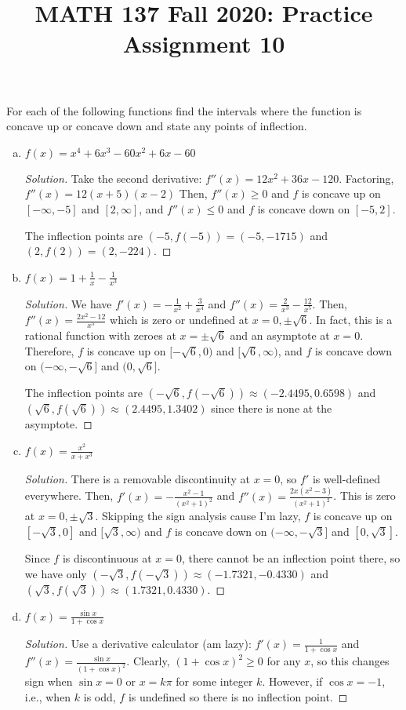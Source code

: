 
\title{MATH 137 Fall 2020: Practice Assignment 10}


\thispagestyle{firstpage}
\textbf{\@title}

\question For each of the following functions find the intervals where the function
is concave up or concave down and state any points of inflection.
\begin{enumerate}[(a)]
  \item $f(x) = x^4+6x^3-60x^2+6x-60$
        \begin{proof}[Solution]
          Take the second derivative: $f''(x) = 12x^2 + 36x - 120$.
          Factoring, $f''(x) = 12(x+5)(x-2)$
          Then, $f''(x) \geq 0$ and $f$ is concave up on $[-\infty,-5]$ and $[2,\infty]$,
          and $f''(x) \leq 0$ and $f$ is concave down on $[-5,2]$.

          The inflection points are $(-5,f(-5)) = (-5,-1715)$ and $(2,f(2)) = (2,-224)$.
        \end{proof}
  \item $f(x) = 1+\frac{1}{x}-\frac{1}{x^3}$
        \begin{proof}[Solution]
          We have $f'(x) = -\frac{1}{x^2} + \frac{3}{x^4}$ and $f''(x) = \frac{2}{x^3} - \frac{12}{x^5}$.
          Then, $f''(x) = \frac{2x^2-12}{x^5}$ which is zero or undefined at $x=0,\pm\sqrt6$.
          In fact, this is a rational function with zeroes at $x=\pm\sqrt6$ and an asymptote at $x=0$.
          Therefore, $f$ is concave up on $[-\sqrt6,0)$ and $[\sqrt6,\infty)$,
          and $f$ is concave down on $(-\infty,-\sqrt6]$ and $(0,\sqrt6]$.

          The inflection points are $(-\sqrt6,f(-\sqrt6)) \approx (-2.4495, 0.6598)$
          and $(\sqrt6,f(\sqrt6)) \approx (2.4495,1.3402)$ since there is none at the asymptote.
        \end{proof}
  \item $f(x) = \frac{x^2}{x+x^3}$
        \begin{proof}[Solution]
          There is a removable discontinuity at $x=0$, so $f'$ is well-defined everywhere.
          Then, $f'(x) = -\frac{x^2-1}{(x^2+1)^2}$ and $f''(x) = \frac{2x(x^2-3)}{(x^2+1)^2}$.
          This is zero at $x=0,\pm\sqrt3$.
          Skipping the sign analysis cause I'm lazy, $f$ is concave up on $[-\sqrt3,0]$ and $[\sqrt3,\infty)$
          and $f$ is concave down on $(-\infty,-\sqrt3]$ and $[0,\sqrt3]$.

          Since $f$ is discontinuous at $x=0$, there cannot be an inflection point there, so we have only
          $(-\sqrt3,f(-\sqrt3)) \approx (-1.7321, -0.4330)$ and $(\sqrt3,f(\sqrt3)) \approx (1.7321, 0.4330)$.
        \end{proof}
  \item $f(x) = \frac{\sin x}{1+\cos x}$
        \begin{proof}[Solution]
          Use a derivative calculator (am lazy):
          $f'(x) = \frac{1}{1+\cos x}$ and $f''(x) = \frac{\sin x}{(1+\cos x)^2}$.
          Clearly, $(1+\cos x)^2 \geq 0$ for any $x$,
          so this changes sign when $\sin x = 0$ or $x = k\pi$ for some integer $k$.
          However, if $\cos x = -1$, i.e., when $k$ is odd, $f$ is undefined so there is no inflection point.


\end{proof}
\end{enumerate}
